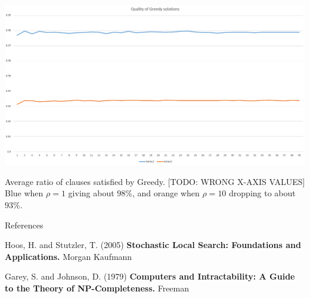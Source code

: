 \documentclass[12pt]{beamer}
\begin{document}
\begin{frame}
\begin{center}
	\includegraphics[width=\textwidth]{img/greedy1}
\end{center}

Average ratio of clauses satisfied by Greedy. [TODO: WRONG X-AXIS VALUES]
Blue when $\rho=1$ giving about $98\%$, and orange when $\rho=10$ dropping to about $93\%$.
\end{frame}

%
%
%
%

\begin{frame}
{References}
	
	\begin{thebibliography}{References}
		\beamertemplatebookbibitems
		Hoos, H. and Stutzler, T. (2005)
		\textbf{Stochastic Local Search: Foundations and Applications.}
		Morgan Kaufmann

		Garey, S. and Johnson, D. (1979)
		\textbf{Computers and Intractability: A Guide to the Theory of NP-Completeness.}
		Freeman
				
	\end{thebibliography}
	
\end{frame}
\end{document}
